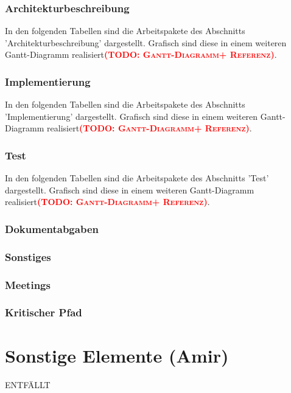 \documentclass[fontsize=12pt,paper=a4,twoside]{scrartcl}
\newcommand{\todo}[1]{\textbf{\textsc{\textcolor{red}{(TODO: #1)}}}}
\begin{document}
\subsubsection{Architekturbeschreibung}\label{aps}

In den folgenden Tabellen sind die Arbeitspakete des Abschnitts 'Architekturbeschreibung' dargestellt. Grafisch sind diese in einem weiteren Gantt-Diagramm realisiert\todo{Gantt-Diagramm+ Referenz}.

\subsubsection{Implementierung}\label{aps}

In den folgenden Tabellen sind die Arbeitspakete des Abschnitts 'Implementierung' dargestellt. Grafisch sind diese in einem weiteren Gantt-Diagramm realisiert\todo{Gantt-Diagramm+ Referenz}.

\subsubsection{Test}\label{aps}

In den folgenden Tabellen sind die Arbeitspakete des Abschnitts 'Test' dargestellt. Grafisch sind diese in einem weiteren Gantt-Diagramm realisiert\todo{Gantt-Diagramm+ Referenz}.


\subsubsection{Dokumentabgaben}\label{aps}

\subsubsection{Sonstiges}\label{aps}

\subsubsection{Meetings}\label{aps}

\subsubsection{Kritischer Pfad}\label{aps}

\section{Sonstige Elemente (Amir)}
ENTFÄLLT
\end{document}
